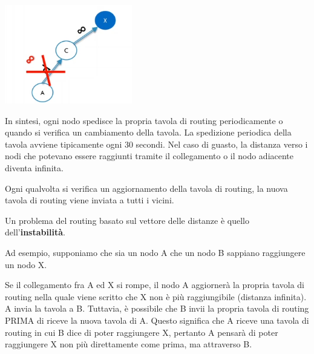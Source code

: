             \begin{center}
                \includegraphics[scale=0.5]{images/Vector5.png}
            \end{center}
            
            In sintesi, ogni nodo spedisce la propria tavola di routing periodicamente o quando si verifica un cambiamento della tavola. La spedizione periodica della tavola avviene tipicamente ogni 30 secondi. Nel caso di guasto, la distanza verso i nodi che potevano essere raggiunti tramite il collegamento o il nodo adiacente diventa infinita. 
            
            Ogni qualvolta si verifica un aggiornamento della tavola di routing, la nuova tavola di routing viene inviata a tutti i vicini.
            
            
                Un problema del routing basato sul vettore delle distanze è quello dell'\textbf{instabilità}.
                
                \vspace{3mm}
                
                Ad esempio, supponiamo che sia un nodo A che un nodo B sappiano raggiungere un nodo X.
                
                \vspace{3mm}
                
                Se il collegamento fra A ed X si rompe, il nodo A aggiornerà la propria tavola di routing nella quale viene scritto che X non è più raggiungibile (distanza infinita). A invia la tavola a B. Tuttavia, è possibile che B invii la propria tavola di routing PRIMA di riceve la nuova tavola di A. Questo significa che A riceve una tavola di routing in cui B dice di poter raggiungere X, pertanto A pensarà di poter raggiungere X non più direttamente come prima, ma attraverso B.
                
                \vspace{3mm}
                
